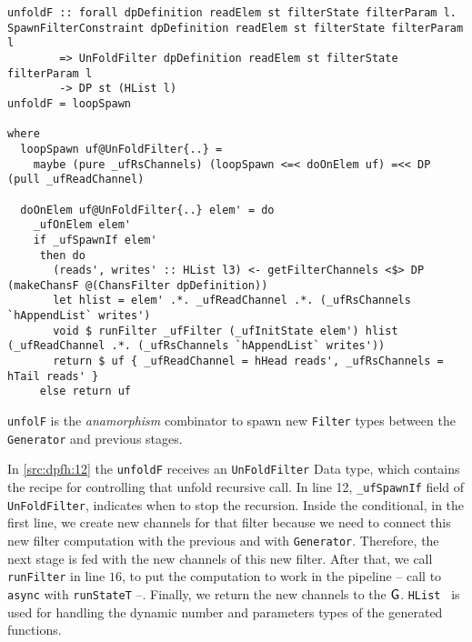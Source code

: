\begin{listing}[htp!]
  \begin{verbatim}
unfoldF :: forall dpDefinition readElem st filterState filterParam l. SpawnFilterConstraint dpDefinition readElem st filterState filterParam l
        => UnFoldFilter dpDefinition readElem st filterState filterParam l 
        -> DP st (HList l) 
unfoldF = loopSpawn

where
  loopSpawn uf@UnFoldFilter{..} =
    maybe (pure _ufRsChannels) (loopSpawn <=< doOnElem uf) =<< DP (pull _ufReadChannel)

  doOnElem uf@UnFoldFilter{..} elem' = do
    _ufOnElem elem'
    if _ufSpawnIf elem'
     then do
       (reads', writes' :: HList l3) <- getFilterChannels <$> DP (makeChansF @(ChansFilter dpDefinition))
       let hlist = elem' .*. _ufReadChannel .*. (_ufRsChannels `hAppendList` writes')
       void $ runFilter _ufFilter (_ufInitState elem') hlist (_ufReadChannel .*. (_ufRsChannels `hAppendList` writes'))
       return $ uf { _ufReadChannel = hHead reads', _ufRsChannels = hTail reads' }
     else return uf

  \end{verbatim}
  \caption[{[\texttt{Stage.hs}] unfoldF}]{\texttt{unfolF} is the \emph{anamorphism} combinator to spawn new \texttt{Filter} types between the \texttt{Generator} and previous stages.}
  \label{src:dpfh:12}
\end{listing}

In \autoref{src:dpfh:12} the \texttt{unfoldF} receives an \texttt{UnFoldFilter} Data type, which contains the recipe for controlling that unfold recursive call. 
In line 12, \texttt{_ufSpawnIf} field of \texttt{UnFoldFilter}, indicates when to stop the recursion. 
Inside the conditional, in the first line, we create new channels for that filter because we need to connect this new filter computation with the previous and with \texttt{Generator}. 
Therefore, the next stage is fed with the new channels of this new filter. After that, we call \texttt{runFilter} in line $16$, to put the computation 
to work in the pipeline -- call to \texttt{async} with \texttt{runStateT} --. Finally, we return the new channels to the $\mathsf{G}$.
\texttt{HList}~\cite{hlist} is used for handling the dynamic number and parameters types of the generated functions.

